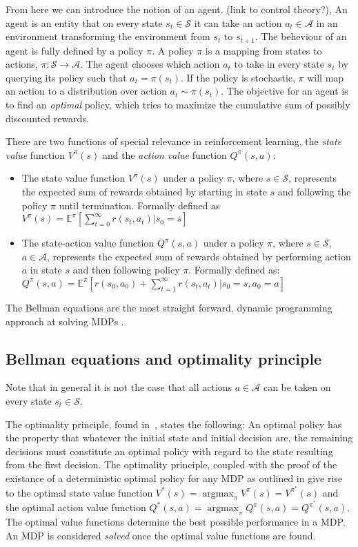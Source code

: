 \documentclass{../main.tex}{subfiles}
\begin{document}
From here we can introduce the notion of an agent. (link to control theory?), An agent is an entity that on every state $s_t \in \mathcal{S}$ it can take an action $a_t \in \mathcal{A}$ in an environment transforming the environment from $s_t$ to $s_{t+1}$. The beheviour of an agent is fully defined by a policy $\pi$. A policy $\pi$ is a mapping from states to actions, $\pi: \mathcal{S} \to \mathcal{A}$. The agent chooses which action $a_t$ to take in every state $s_t$ by querying its policy such that $a_t = \pi(s_t)$. If the policy is stochastic, $\pi$ will map an action to a distribution over action $a_t \sim \pi(s_t)$. The objective for an agent is to find an \textit{optimal} policy, which tries to maximize the cumulative sum of possibly discounted rewards.

There are two functions of special relevance in reinforcement learning, the \textit{state value} function $V^{\pi}(s)$ and the \textit{action value} function $Q^{\pi}(s, a)$:
\begin{itemize}
\item The state value function $V^{\pi}(s)$ under a policy $\pi$, where $s \in \mathcal{S}$, represents the expected sum of rewards obtained by starting in state $s$ and following the policy $\pi$ until termination. Formally defined as $V^{\pi}(s) = \mathbb{E}^{\pi}[\sum^{\infty}_{t=0} r(s_t, a_t) | s_0 = s] $
\item The state-action value function $Q^{\pi}(s, a)$ under a policy $\pi$, where $s \in \mathcal{S}$, $a \in \mathcal{A}$, represents the expected sum of rewards obtained by performing action $a$ in state $s$ and then following policy $\pi$. Formally defined as: $Q^{\pi}(s, a) = \mathbb{E}^{\pi}[r(s_0, a_0) + \sum^{\infty}_{t=1} r(s_t, a_t) | s_0 = s, a_0 = a]$
\end{itemize}

The Bellman equations are the most straight forward, dynamic programming approach at solving MDPs \citep{Bertsekas2007, Bellman1957}.

\subsection{Bellman equations and optimality principle}

Note that in general it is not the case that all actions $a \in \mathcal{A}$ can be taken on every state $s_t \in \mathcal{S}$.

The optimality principle, found in~\cite{Bellman1957}, states the following: An optimal policy has the property that whatever the initial state and initial decision are, the remaining decisions must constitute an optimal policy with regard to the state resulting from the first decision. The optimality principle, coupled with the proof of the existance of a deterministic optimal policy for any MDP as outlined in \citep{Borkar1988} give rise to the optimal state value function $V^{*}(s) = \operatorname*{argmax}_{\pi} V^{\pi}(s) = V^{\pi^{*}}(s)$ and the optimal action value function $Q^{*}(s,a) = \operatorname*{argmax}_{\pi} Q^{\pi}(s, a) = Q^{\pi^{*}}(s, a)$. The optimal value functions determine the best possible performance in a MDP\@. An MDP is considered \textit{solved} once the optimal value functions are found. 
\end{document}
